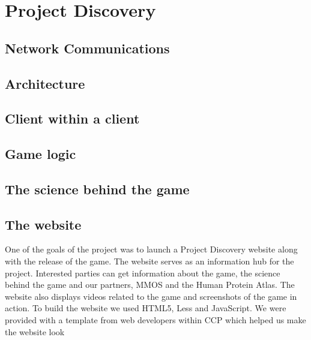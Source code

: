 \section{Project Discovery}\label{sec:projectdiscovery}

\subsection{Network Communications}

\subsection{Architecture}

\subsection{Client within a client}

\subsection{Game logic}

\subsection{The science behind the game}

\subsection{The website}
One of the goals of the project was to launch a Project Discovery website along with the release of the game. The website serves as an information hub for the project. Interested parties can get information about the game, the science behind the game and our partners, MMOS and the Human Protein Atlas. The website also displays videos related to the game and screenshots of the game in action. To build the website we used HTML5, Less and JavaScript. We were provided with a template from web developers within CCP which helped us make the website look 